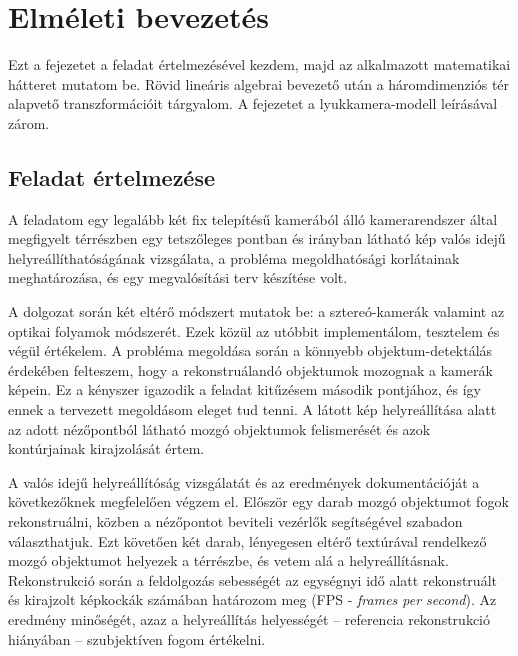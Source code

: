 \chapter{Elméleti bevezetés}\label{ch:elmelet}

Ezt a fejezetet a feladat értelmezésével kezdem, majd az alkalmazott matematikai hátteret mutatom be. Rövid lineáris algebrai bevezető után a háromdimenziós tér alapvető transzformációit tárgyalom. A fejezetet a lyukkamera-modell leírásával zárom.

\section{Feladat értelmezése}

A feladatom egy legalább két fix telepítésű kamerából álló kamerarendszer által megfigyelt térrészben egy tetszőleges pontban és irányban látható kép valós idejű helyreállíthatóságának vizsgálata, a probléma megoldhatósági korlátainak meghatározása, és egy megvalósítási terv készítése volt.

A dolgozat során két eltérő módszert mutatok be: a sztereó-kamerák valamint az optikai folyamok módszerét. Ezek közül az utóbbit implementálom, tesztelem és végül értékelem. A probléma megoldása során a könnyebb objektum-detektálás érdekében felteszem, hogy a rekonstruálandó objektumok mozognak a kamerák képein. Ez a kényszer igazodik a feladat kitűzésem második pontjához, és így ennek a tervezett megoldásom eleget tud tenni. A látott kép helyreállítása alatt az adott nézőpontból látható mozgó objektumok felismerését és azok kontúrjainak kirajzolását értem.

A valós idejű helyreállítóság vizsgálatát és az eredmények dokumentációját a következőknek megfelelően végzem el. Először egy darab mozgó objektumot fogok rekonstruálni, közben a nézőpontot beviteli vezérlők segítségével szabadon választhatjuk. Ezt követően két darab, lényegesen eltérő textúrával rendelkező mozgó objektumot helyezek a térrészbe, és vetem alá a helyreállításnak. Rekonstrukció során a feldolgozás sebességét az egységnyi idő alatt rekonstruált és kirajzolt képkockák számában határozom meg (FPS - \textit{frames per second}). Az eredmény minőségét, azaz a helyreállítás helyességét -- referencia rekonstrukció hiányában -- szubjektíven fogom értékelni.

